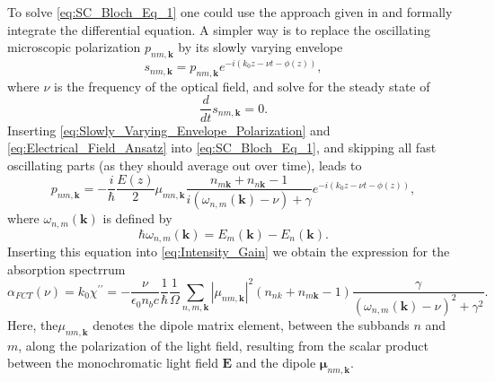 To solve \ref{eq:SC_Bloch_Eq_1} one could use the approach given
in \citealp{Chow} and formally integrate the differential equation.
A simpler way is to replace the oscillating microscopic polarization
$p_{nm,\mathbf{k}}$ by its slowly varying envelope\begin{equation}
s_{nm,\mathbf{k}}=p_{nm,\mathbf{k}}e^{-i\left(k_{0}z-\nu t-\phi(z)\right)},\label{eq:Slowly_Varying_Envelope_Polarization}\end{equation}
where $\nu$ is the frequency of the optical field, and solve for
the steady state of \begin{equation}
\frac{d}{dt}s_{nm,\mathbf{k}}=0.\end{equation}
Inserting \ref{eq:Slowly_Varying_Envelope_Polarization} and \ref{eq:Electrical_Field_Ansatz}
into \ref{eq:SC_Bloch_Eq_1}, and skipping all fast oscillating parts
(as they should average out over time), leads to\begin{equation}
p_{nm,\mathbf{k}}=-\frac{i}{\hbar}\frac{E(z)}{2}\mu_{mn,\mathbf{k}}\frac{n_{m\mathbf{k}}+n_{n\mathbf{k}}-1}{i\left(\omega_{n,m}(\mathbf{k})-\nu\right)+\gamma}e^{-i\left(k_{0}z-\nu t-\phi(z)\right)},\end{equation}
where $\omega_{n,m}(\mathbf{k})$ is defined by \begin{equation}
\hbar\omega_{n,m}(\mathbf{k})=E_{m}(\mathbf{k})-E_{n}(\mathbf{k}).\end{equation}
 Inserting this equation into \ref{eq:Intensity_Gain} we obtain the
expression for the absorption spectrrum \begin{equation}
\alpha_{FCT}(\nu)=k_{0}\chi^{\prime\prime}=-\frac{\nu}{\epsilon_{0}n_{b}c}\frac{1}{\hbar}\frac{1}{\Omega}\sum_{n,m,\mathbf{k}}\left|\mu_{nm,\mathbf{k}}\right|^{2}\left(n_{nk}+n_{m\mathbf{k}}-1\right)\frac{\gamma}{\left(\omega_{n,m}(\mathbf{k})-\nu\right)^{2}+\gamma^{2}}.\label{eq:Absorption_FCT}\end{equation}
Here, the$\mu_{nm,\mathbf{k}}$ denotes the dipole matrix element,
between the subbands $n$ and $m$, along the polarization of the
light field, resulting from the scalar product between the monochromatic
light field $\mathbf{E}$ and the dipole $\boldsymbol{\mu}_{nm,\mathbf{k}}$.

